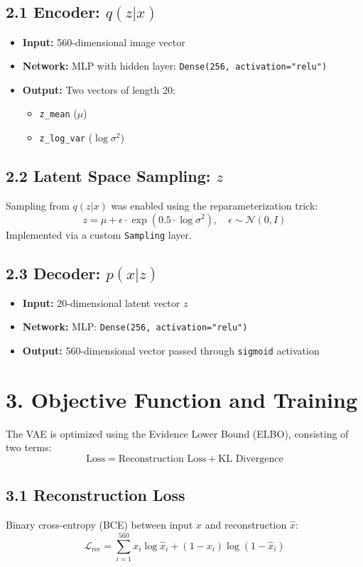 \documentclass[12pt]{article}
\begin{document}
\subsection*{2.1 Encoder: $q(z|x)$}
\begin{itemize}
    \item \textbf{Input:} 560-dimensional image vector
    \item \textbf{Network:} MLP with hidden layer: \texttt{Dense(256, activation="relu")}
    \item \textbf{Output:} Two vectors of length 20:
    \begin{itemize}
        \item \texttt{z\_mean} ($\mu$)
        \item \texttt{z\_log\_var} ($\log \sigma^2$)
    \end{itemize}
\end{itemize}

\subsection*{2.2 Latent Space Sampling: $z$}
Sampling from $q(z|x)$ was enabled using the reparameterization trick:
\[
z = \mu + \epsilon \cdot \exp\left(0.5 \cdot \log \sigma^2\right), \quad \epsilon \sim \mathcal{N}(0, I)
\]
Implemented via a custom \texttt{Sampling} layer.

\subsection*{2.3 Decoder: $p(x|z)$}
\begin{itemize}
    \item \textbf{Input:} 20-dimensional latent vector $z$
    \item \textbf{Network:} MLP: \texttt{Dense(256, activation="relu")}
    \item \textbf{Output:} 560-dimensional vector passed through \texttt{sigmoid} activation
\end{itemize}

\section*{3. Objective Function and Training}

The VAE is optimized using the Evidence Lower Bound (ELBO), consisting of two terms:
\[
\text{Loss} = \text{Reconstruction Loss} + \text{KL Divergence}
\]

\subsection*{3.1 Reconstruction Loss}
Binary cross-entropy (BCE) between input $x$ and reconstruction $\hat{x}$:
\[
\mathcal{L}_{\text{rec}} = \sum_{i=1}^{560} x_i \log \hat{x}_i + (1 - x_i)\log(1 - \hat{x}_i)
\]
\end{document}
